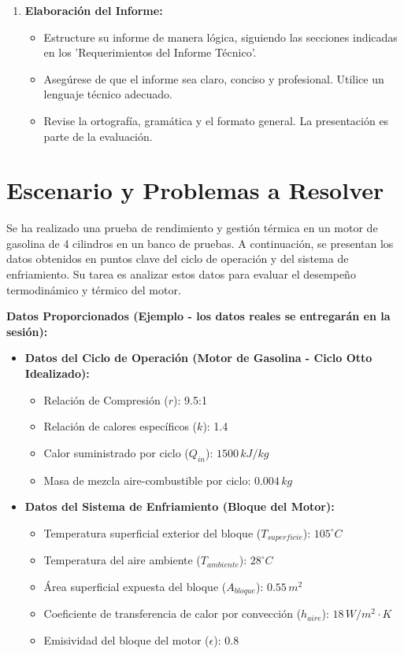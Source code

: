 \documentclass{article}
\begin{document}
\begin{enumerate}
\begin{itemize}
    \end{itemize}
    \item \textbf{Elaboración del Informe:}
    \begin{itemize}
        \item Estructure su informe de manera lógica, siguiendo las secciones indicadas en los 'Requerimientos del Informe Técnico'.
        \item Asegúrese de que el informe sea claro, conciso y profesional. Utilice un lenguaje técnico adecuado.
        \item Revise la ortografía, gramática y el formato general. La presentación es parte de la evaluación.
    \end{itemize}
\end{enumerate}

\section*{Escenario y Problemas a Resolver}

Se ha realizado una prueba de rendimiento y gestión térmica en un motor de gasolina de 4 cilindros en un banco de pruebas. A continuación, se presentan los datos obtenidos en puntos clave del ciclo de operación y del sistema de enfriamiento. Su tarea es analizar estos datos para evaluar el desempeño termodinámico y térmico del motor.

\textbf{Datos Proporcionados (Ejemplo - los datos reales se entregarán en la sesión):}

\begin{itemize}
    \item \textbf{Datos del Ciclo de Operación (Motor de Gasolina - Ciclo Otto Idealizado):}
    \begin{itemize}
        \item Relación de Compresión ($r$): 9.5:1
        \item Relación de calores específicos ($k$): 1.4
        \item Calor suministrado por ciclo ($Q_{in}$): $1500 \, kJ/kg$
        \item Masa de mezcla aire-combustible por ciclo: $0.004 \, kg$
    \end{itemize}
    \item \textbf{Datos del Sistema de Enfriamiento (Bloque del Motor):}
    \begin{itemize}
        \item Temperatura superficial exterior del bloque ($T_{superficie}$): $105^\circ C$
        \item Temperatura del aire ambiente ($T_{ambiente}$): $28^\circ C$
        \item Área superficial expuesta del bloque ($A_{bloque}$): $0.55 \, m^2$
        \item Coeficiente de transferencia de calor por convección ($h_{aire}$): $18 \, W/m^2 \cdot K$
        \item Emisividad del bloque del motor ($\epsilon$): $0.8$
    \end{itemize}
\end{itemize}
\end{document}
